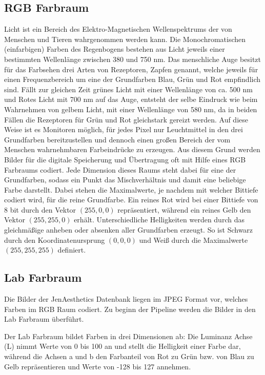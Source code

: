 \subsection{RGB Farbraum}

Licht ist ein Bereich des Elektro-Magnetischen Wellenspektrums der von Menschen und Tieren wahrgenommen werden kann. Die Monochromatischen (einfarbigen) Farben des Regenbogens bestehen aus Licht jeweils einer bestimmten Wellenlänge zwischen 380 und 750 nm. Das menschliche Auge besitzt für das Farbsehen drei Arten von Rezeptoren, Zapfen genannt, welche jeweils für einen Frequenzbereich um eine der Grundfarben Blau, Grün und Rot empfindlich sind. Fällt zur gleichen Zeit grünes Licht mit einer Wellenlänge von ca. 500 nm und Rotes Licht mit 700 nm auf das Auge, entsteht der selbe Eindruck wie beim Wahrnehmen von gelbem Licht, mit einer Wellenlänge von 580 nm, da in beiden Fällen die Rezeptoren für Grün und Rot gleichstark gereizt werden. Auf diese Weise ist es Monitoren möglich, für jedes Pixel nur Leuchtmittel in den drei Grundfarben bereitzustellen und dennoch einen großen Bereich der vom Menschen wahrnehmbaren Farbeindrücke zu erzeugen. Aus diesem Grund werden Bilder für die digitale Speicherung und Übertragung oft mit Hilfe eines RGB Farbraums codiert. Jede Dimension dieses Raums steht dabei für eine der Grundfarben, sodass ein Punkt das Mischverhältnis und damit eine beliebige Farbe darstellt. Dabei stehen die Maximalwerte, je nachdem mit welcher Bittiefe codiert wird, für die reine Grundfarbe. Ein reines Rot wird bei einer Bittiefe von 8 bit durch den Vektor $\left(255, 0, 0\right)$ repräsentiert, während ein reines Gelb den Vektor $ \left(255, 255, 0\right) $ erhält. Unterschiedliche Helligkeiten werden durch das gleichmäßige anheben oder absenken aller Grundfarben erzeugt. So ist Schwarz durch den Koordinatenursprung $ \left(0, 0, 0\right) $ und Weiß durch die Maximalwerte $ \left(255, 255, 255\right) $ definiert.


\subsection{Lab Farbraum}



Die Bilder der JenAesthetics Datenbank liegen im JPEG Format vor, welches Farben im RGB Raum codiert. Zu beginn der Pipeline werden die Bilder in den Lab Farbraum überführt.


\theoremstyle{definition}
\begin{definition}
	Der Lab Farbraum bildet Farben in drei Dimensionen ab: Die Luminanz Achse (L) nimmt Werte von 0 bis 100 an und stellt die Helligkeit einer Farbe dar, während die Achsen a und b den Farbanteil von Rot zu Grün bzw. von Blau zu Gelb repräsentieren und Werte von -128 bis 127 annehmen.
\end{definition}

